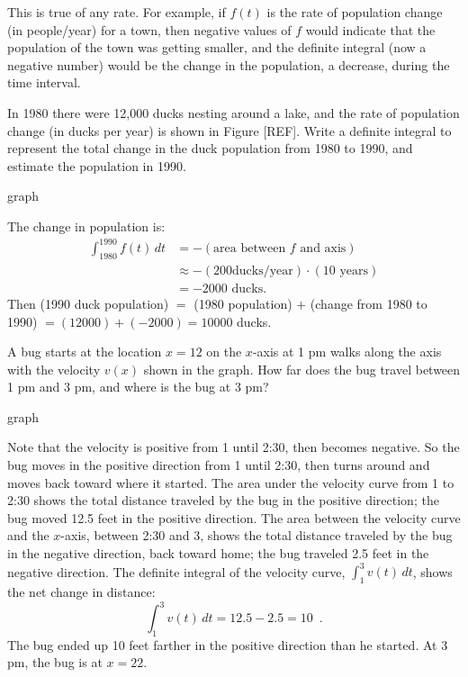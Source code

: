 \begin{definition}
This is true of any rate. For example, if $f(t)$ is the rate of population change (in people/year) for a town, then negative values of $f$ would indicate that the population of the town was getting smaller, and the definite integral (now a negative number) would be the change in the population, a decrease, during the time interval.

\begin{example}
In 1980 there were 12,000 ducks nesting around a lake, and the rate of population change (in ducks per year) is shown in Figure [REF]. Write a definite integral to represent the total change in the duck population from 1980 to 1990, and estimate the population in 1990.

graph
\begin{solution}
The change in population is:
\begin{align*}
  \int_{1980}^{1990}f(t)\,dt &= -(\text{area between }f\text{ and axis}) \\
    &\approx   -(200 \text{ducks/year})\cdot(10\text{ years})\\
    &= -2000\text{ ducks.}
  \end{align*}
Then (1990 duck population) $=$ (1980 population) $+$ (change from 1980 to 1990) $= (12000) + (-2000) = 10000$ ducks.
\end{solution}\end{example}

\begin{example}
A bug starts at the location $x=12$ on the $x$-axis at 1 pm walks along the axis with the velocity $v(x)$ shown in the graph. How far does the bug travel between 1 pm and 3 pm, and where is the bug at 3 pm?

graph
\begin{solution}
Note that the velocity is positive from 1 until 2:30, then becomes negative. So the bug moves in the positive direction from 1 until 2:30, then turns around and moves back toward where it started. The area under the velocity curve from 1 to 2:30 shows the total distance traveled by the bug in the positive direction; the bug moved 12.5 feet in the positive direction. The area between the velocity curve and the $x$-axis, between 2:30 and 3, shows the total distance traveled by the bug in the negative direction, back toward home; the bug traveled 2.5 feet in the negative direction. The definite integral of the velocity curve, $\int_1^3v(t)\,dt$, shows the net change in distance:
$$\int_1^3v(t)\,dt = 12.5-2.5 = 10 \enspace .$$
The bug ended up 10 feet farther in the positive direction than he started. At 3 pm, the bug is at $x=22$.
\end{solution}\end{example}


\end{definition}

